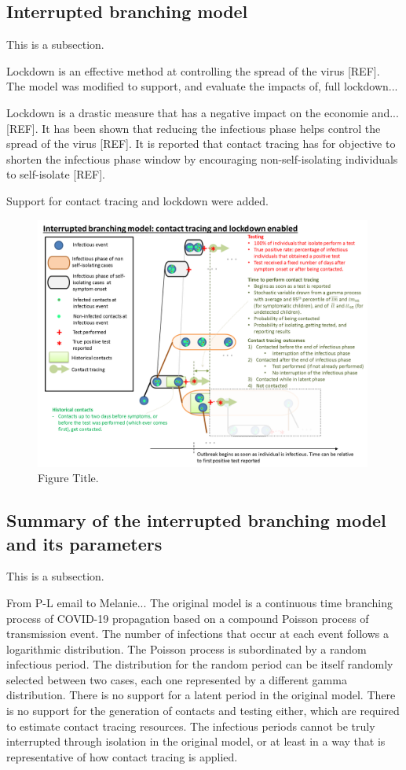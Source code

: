 \documentclass[sr]{drdc-report}
\begin{document}
\subsection{Interrupted branching model}
This is a subsection.

Lockdown is an effective method at controlling the spread of the virus [REF]. The model was modified to support, and evaluate the impacts of, full lockdown... 

Lockdown is a drastic measure that has a negative impact on the economie and... [REF]. It has been shown that reducing the infectious phase helps control the spread of the virus [REF]. It is reported that contact tracing has for objective to shorten the infectious phase window by encouraging non-self-isolating individuals to self-isolate [REF]. 

Support for contact tracing and lockdown were added. 

\begin{figure}
  \includegraphics[width=0.99\textwidth, keepaspectratio=true]{figures/InterruptedBranchingModel}
  \caption{Figure Title.}\label{fig_branchingModel}
\end{figure}

\subsection{Summary of the interrupted branching model and its parameters}
This is a subsection.

From P-L email to Melanie...
The original model is a continuous time branching process of COVID-19 propagation based on a compound Poisson process of transmission event. The number of infections that occur at each event follows a logarithmic distribution. The Poisson process is subordinated by a random infectious period. The distribution for the random period can be itself randomly selected between two cases, each one represented by a different gamma distribution. There is no support for a latent period in the original model. There is no support for the generation of contacts and testing either, which are required to estimate contact tracing resources. The infectious periods cannot be truly interrupted through isolation in the original model, or at least in a way that is representative of how contact tracing is applied.
\end{document}
